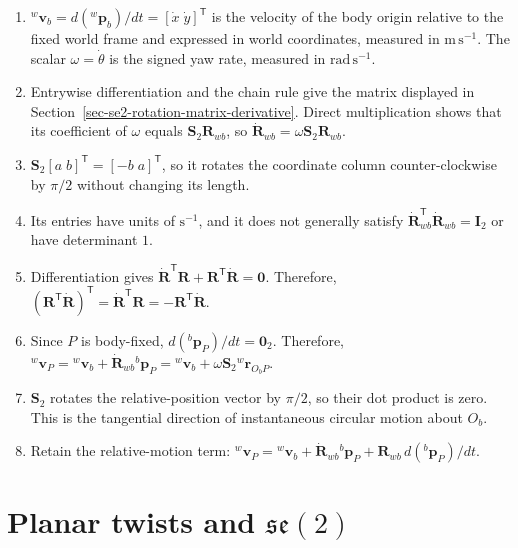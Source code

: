 \documentclass[
  australian,
  12pt,
  letterpaper,
  DIV=11,
  numbers=noendperiod,
  twoside]{scrreprt}
\providecommand{\tightlist}{%
  \setlength{\itemsep}{0pt}\setlength{\parskip}{0pt}}
\begin{document}
\begin{enumerate}
\def\labelenumi{\arabic{enumi}.}
\tightlist
\item
  \({}^{w}\mathbf v_b=d({}^{w}\mathbf p_b)/dt=[\dot x\;\dot y]^\mathsf T\)
  is the velocity of the body origin relative to the fixed world frame
  and expressed in world coordinates, measured in
  \(\mathrm{m\,s^{-1}}\). The scalar \(\omega=\dot\theta\) is the signed
  yaw rate, measured in \(\mathrm{rad\,s^{-1}}\).
\item
  Entrywise differentiation and the chain rule give the matrix displayed
  in Section~\ref{sec-se2-rotation-matrix-derivative}. Direct
  multiplication shows that its coefficient of \(\omega\) equals
  \(\mathbf S_2\mathbf R_{wb}\), so
  \(\dot{\mathbf R}_{wb}=\omega\mathbf S_2\mathbf R_{wb}\).
\item
  \(\mathbf S_2[a\;b]^\mathsf T=[-b\;a]^\mathsf T\), so it rotates the
  coordinate column counter-clockwise by \(\pi/2\) without changing its
  length.
\item
  Its entries have units of \(\mathrm{s^{-1}}\), and it does not
  generally satisfy
  \(\dot{\mathbf R}_{wb}^\mathsf T\dot{\mathbf R}_{wb}=\mathbf I_2\) or
  have determinant \(1\).
\item
  Differentiation gives
  \(\dot{\mathbf R}^\mathsf T\mathbf R+\mathbf R^\mathsf T\dot{\mathbf R}=\mathbf 0\).
  Therefore,
  \((\mathbf R^\mathsf T\dot{\mathbf R})^\mathsf T=\dot{\mathbf R}^\mathsf T\mathbf R=-\mathbf R^\mathsf T\dot{\mathbf R}\).
\item
  Since \(P\) is body-fixed, \(d({}^{b}\mathbf p_P)/dt=\mathbf 0_2\).
  Therefore,
  \({}^{w}\mathbf v_P={}^{w}\mathbf v_b+\dot{\mathbf R}_{wb}{}^{b}\mathbf p_P={}^{w}\mathbf v_b+\omega\mathbf S_2{}^{w}\mathbf r_{O_bP}\).
\item
  \(\mathbf S_2\) rotates the relative-position vector by \(\pi/2\), so
  their dot product is zero. This is the tangential direction of
  instantaneous circular motion about \(O_b\).
\item
  Retain the relative-motion term:
  \({}^{w}\mathbf v_P={}^{w}\mathbf v_b+\dot{\mathbf R}_{wb}{}^{b}\mathbf p_P+\mathbf R_{wb}\,d({}^{b}\mathbf p_P)/dt\).
\end{enumerate}

\section{\texorpdfstring{Planar twists and
\(\mathfrak{se}(2)\)}{Planar twists and \textbackslash mathfrak\{se\}(2)}}\label{planar-twists-and-mathfrakse2}
\end{document}
